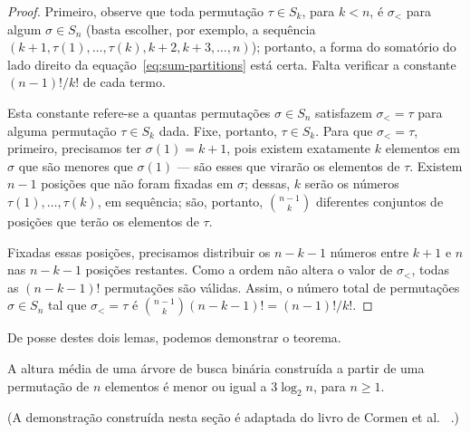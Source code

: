 \begin{proof}
    Primeiro,
    observe que toda permutação $\tau \in S_k$, para $k < n$,
    é $\sigma_<$ para algum $\sigma \in S_n$
    (basta escolher, por exemplo,
    a sequência $(k+1, \tau(1), \dots, \tau(k), k+2, k+3, \dots, n)$);
    portanto,
    a forma do somatório do lado direito da equação~\ref{eq:sum-partitions} está certa.
    Falta verificar a constante $(n-1)!/k!$ de cada termo.

    Esta constante refere-se a quantas permutações $\sigma \in S_n$
    satisfazem $\sigma_< = \tau$ para alguma permutação $\tau \in S_k$ dada.
    Fixe, portanto, $\tau \in S_k$.
    Para que $\sigma_< = \tau$,
    primeiro, precisamos ter $\sigma(1) = k+1$,
    pois existem exatamente $k$ elementos em $\sigma$ que são menores que $\sigma(1)$
    --- são esses que virarão os elementos de $\tau$.
    Existem $n-1$ posições que não foram fixadas em $\sigma$;
    dessas, $k$ serão os números $\tau(1), \dots, \tau(k)$,
    em sequência;
    são, portanto, $\binom{n-1}{k}$ diferentes conjuntos de posições
    que terão os elementos de $\tau$.

    Fixadas essas posições,
    precisamos distribuir os $n - k - 1$ números entre $k+1$ e $n$
    nas $n - k - 1$ posições restantes.
    Como a ordem não altera o valor de $\sigma_<$,
    todas as $(n - k - 1)!$ permutações são válidas.
    Assim, o número total de permutações $\sigma \in S_n$
    tal que $\sigma_< = \tau$ é $\binom{n-1}{k} (n-k-1)! = (n-1)!/k!$.
\end{proof}

De posse destes dois lemas,
podemos demonstrar o teorema.

\begin{theorem}
    A altura média de uma árvore de busca binária
    construída a partir de uma permutação de $n$ elementos
    é menor ou igual a $3 \log_2 n$, para $n \geq 1$.
    \label{thm:average-tree-depth}
\end{theorem}

(A demonstração construída nesta seção é adaptada do livro de Cormen et al.%
~\cite[p.~300]{CormenLeisersonRivestStein2009}.)

